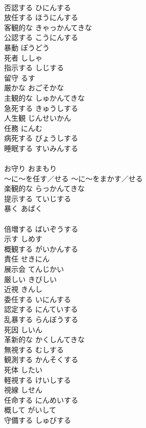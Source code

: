 \documentclass[8pt]{extreport}
\begin{document}
\begin{CJK}{UTF8}{min}
\\	否認する	ひにんする	
\\	放任する	ほうにんする	
\\	客観的な	きゃっかんてきな	
\\	公認する	こうにんする	
\\	暴動	ぼうどう	
\\	死者	ししゃ	
\\	指示する	しじする	
\\	留守	るす	
\\	厳かな	おごそかな	
\\	主観的な	しゅかんてきな	
\\	急死する	きゅうしする	
\\	人生観	じんせいかん	
\\	任務	にんむ	
\\	病死する	びょうしする	
\\	睡眠する	すいみんする	
\\	[漢語]
\\	お守り	おまもり	
\\	～に～を任す／せる	～に～をまかす／せる	
\\	楽観的な	らっかんてきな	
\\	提示する	ていじする	
\\	暴く	あばく	
\\	[和語] 
\\	倍増する	ばいぞうする	
\\	示す	しめす	
\\	概観する	がいかんする	
\\	責任	せきにん	
\\	展示会	てんじかい	
\\	厳しい	きびしい	
\\	近視	きんし	
\\	委任する	いにんする	
\\	認定する	にんていする	
\\	乱暴する	らんぼうする	
\\	死因	しいん	
\\	革新的な	かくしんてきな	
\\	無視する	むしする	
\\	観測する	かんそくする	
\\	死体	したい	
\\	軽視する	けいしする	
\\	視線	しせん	
\\	任命する	にんめいする	
\\	概して	がいして	
\\	守備する	しゅびする	

\end{CJK}
\end{document}

